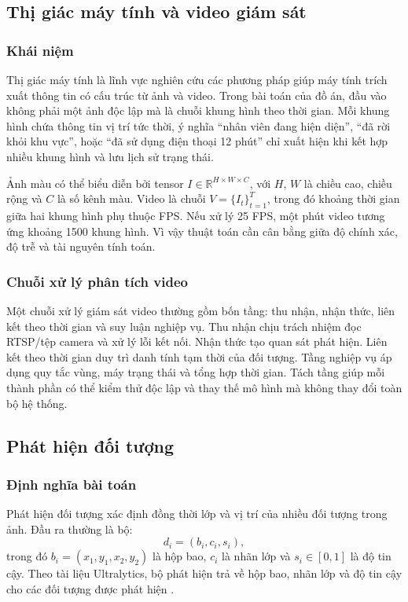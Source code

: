 \setcounter{section}{2}
\setcounter{subsection}{0}
\setcounter{subsubsection}{0}

\subsection{Thị giác máy tính và video giám sát}
\subsubsection{Khái niệm}
Thị giác máy tính là lĩnh vực nghiên cứu các phương pháp giúp máy tính trích xuất thông tin có cấu trúc từ ảnh và video. Trong bài toán của đồ án, đầu vào không phải một ảnh độc lập mà là chuỗi khung hình theo thời gian. Mỗi khung hình chứa thông tin vị trí tức thời, ý nghĩa ``nhân viên đang hiện diện'', ``đã rời khỏi khu vực'', hoặc ``đã sử dụng điện thoại 12 phút'' chỉ xuất hiện khi kết hợp nhiều khung hình và lưu lịch sử trạng thái.

Ảnh màu có thể biểu diễn bởi tensor $I\in\mathbb{R}^{H\times W\times C}$, với $H$, $W$ là chiều cao, chiều rộng và $C$ là số kênh màu. Video là chuỗi $V=\{I_t\}_{t=1}^{T}$, trong đó khoảng thời gian giữa hai khung hình phụ thuộc FPS. Nếu xử lý 25 FPS, một phút video tương ứng khoảng 1500 khung hình. Vì vậy thuật toán cần cân bằng giữa độ chính xác, độ trễ và tài nguyên tính toán.

\subsubsection{Chuỗi xử lý phân tích video}
Một chuỗi xử lý giám sát video thường gồm bốn tầng: thu nhận, nhận thức, liên kết theo thời gian và suy luận nghiệp vụ. Thu nhận chịu trách nhiệm đọc RTSP/tệp camera và xử lý lỗi kết nối. Nhận thức tạo quan sát phát hiện. Liên kết theo thời gian duy trì danh tính tạm thời của đối tượng. Tầng nghiệp vụ áp dụng quy tắc vùng, máy trạng thái và tổng hợp thời gian. Tách tầng giúp mỗi thành phần có thể kiểm thử độc lập và thay thế mô hình mà không thay đổi toàn bộ hệ thống.

\subsection{Phát hiện đối tượng}
\subsubsection{Định nghĩa bài toán}
Phát hiện đối tượng xác định đồng thời lớp và vị trí của nhiều đối tượng trong ảnh. Đầu ra thường là bộ:
\begin{equation}
 d_i=(b_i,c_i,s_i),
\end{equation}
trong đó $b_i=(x_1,y_1,x_2,y_2)$ là hộp bao, $c_i$ là nhãn lớp và $s_i\in[0,1]$ là độ tin cậy. Theo tài liệu Ultralytics, bộ phát hiện trả về hộp bao, nhãn lớp và độ tin cậy cho các đối tượng được phát hiện \cite{ultralyticsdetect}.

